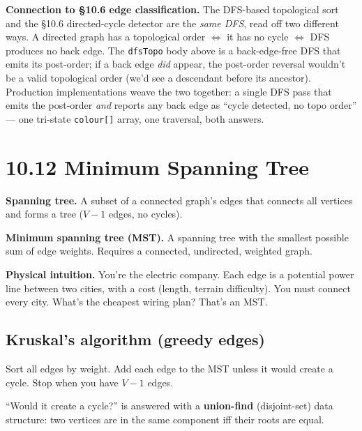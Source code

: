 \documentclass[11pt]{article}
\begin{document}
\begin{notebox}
\textbf{Connection to \S10.6 edge classification.} The DFS-based
topological sort and the \S10.6 directed-cycle detector are the
\emph{same DFS}, read off two different ways. A directed graph has a
topological order $\Leftrightarrow$ it has no cycle
$\Leftrightarrow$ DFS produces no back edge. The
\texttt{dfsTopo} body above is a back-edge-free DFS that emits its
post-order; if a back edge \emph{did} appear, the post-order
reversal wouldn't be a valid topological order (we'd see a
descendant before its ancestor). Production implementations weave
the two together: a single DFS pass that emits the post-order
\emph{and} reports any back edge as ``cycle detected, no topo
order'' --- one tri-state \texttt{colour[]} array, one traversal,
both answers.
\end{notebox}

\section{10.12 Minimum Spanning Tree}

\begin{defnbox}
\textbf{Spanning tree.} A subset of a connected graph's edges that connects all vertices and forms a tree ($V-1$ edges, no cycles).

\textbf{Minimum spanning tree (MST).} A spanning tree with the smallest possible sum of edge weights. Requires a connected, undirected, weighted graph.
\end{defnbox}

\begin{examplebox}
\textbf{Physical intuition.} You're the electric company. Each edge is a potential power line between two cities, with a cost (length, terrain difficulty). You must connect every city. What's the cheapest wiring plan? That's an MST.
\end{examplebox}

\subsection*{Kruskal's algorithm (greedy edges)}

Sort all edges by weight. Add each edge to the MST unless it would create a cycle. Stop when you have $V-1$ edges.

``Would it create a cycle?'' is answered with a \textbf{union-find} (disjoint-set) data structure: two vertices are in the same component iff their roots are equal.
\end{document}
